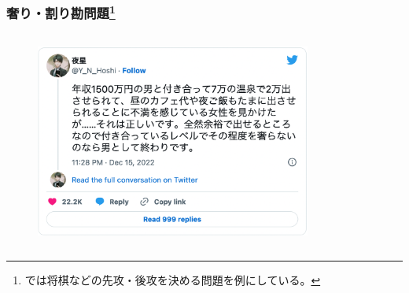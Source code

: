 \begin{frame}
  \frametitle{%
    奢り・割り勘問題\footnote{%
      \cite{covert_lottery_2021}では将棋などの先攻・後攻を決める問題を例にしている。%
    }%
  }

  \begin{columns}
    \begin{column}{0.7\textwidth}
      \begin{figure}[h]
        \includegraphics[width=0.85\textwidth]{./img/twitter.png}\cite{Y_N_Hoshi}
      \end{figure}
    \end{column}
    \begin{column}{0.3\textwidth}
      \pause
    \end{column}
  \end{columns}
\end{frame}


